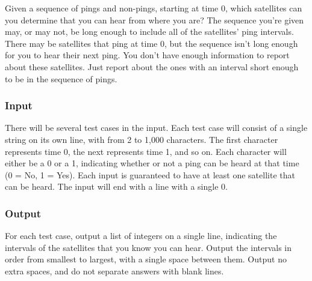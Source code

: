 Given a sequence of pings and non-pings, starting at time 0, which satellites can you determine that you can hear from where you are?
The sequence you're given may, or may not, be long enough to include all of the satellites' ping intervals.
There may be satellites that ping at time 0, but the sequence isn't long enough for you to hear their next ping.
You don't have enough information to report about these satellites.
Just report about the ones with an interval short enough to be in the sequence of pings.

\subsubsection{Input}
There will be several test cases in the input.
Each test case will consist of a single string on its own line, with from 2 to 1,000 characters.
The first character represents time 0, the next represents time 1, and so on.
Each character will either be a 0 or a 1, indicating whether or not a ping can be heard at that time (0 = No, 1 = Yes).
Each input is guaranteed to have at least one satellite that can be heard.
The input will end with a line with a single 0.


\subsubsection{Output}
For each test case, output a list of integers on a single line, indicating the intervals of the satellites that you know you can hear.
Output the intervals in order from smallest to largest, with a single space between them.
Output no extra spaces, and do not separate answers with blank lines.

